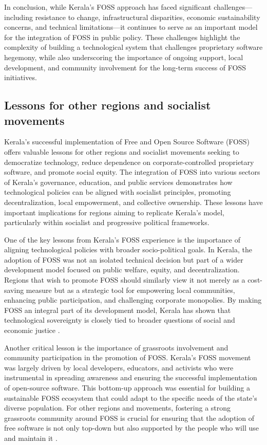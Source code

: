 \begin{refsection}
In conclusion, while Kerala’s FOSS approach has faced significant challenges—including resistance to change, infrastructural disparities, economic sustainability concerns, and technical limitations—it continues to serve as an important model for the integration of FOSS in public policy. These challenges highlight the complexity of building a technological system that challenges proprietary software hegemony, while also underscoring the importance of ongoing support, local development, and community involvement for the long-term success of FOSS initiatives.

\subsection{Lessons for other regions and socialist movements}

Kerala’s successful implementation of Free and Open Source Software (FOSS) offers valuable lessons for other regions and socialist movements seeking to democratize technology, reduce dependence on corporate-controlled proprietary software, and promote social equity. The integration of FOSS into various sectors of Kerala's governance, education, and public services demonstrates how technological policies can be aligned with socialist principles, promoting decentralization, local empowerment, and collective ownership. These lessons have important implications for regions aiming to replicate Kerala’s model, particularly within socialist and progressive political frameworks.

One of the key lessons from Kerala’s FOSS experience is the importance of aligning technological policies with broader socio-political goals. In Kerala, the adoption of FOSS was not an isolated technical decision but part of a wider development model focused on public welfare, equity, and decentralization. Regions that wish to promote FOSS should similarly view it not merely as a cost-saving measure but as a strategic tool for empowering local communities, enhancing public participation, and challenging corporate monopolies. By making FOSS an integral part of its development model, Kerala has shown that technological sovereignty is closely tied to broader questions of social and economic justice \cite[pp.~45-47]{isaac2000local}.

Another critical lesson is the importance of grassroots involvement and community participation in the promotion of FOSS. Kerala’s FOSS movement was largely driven by local developers, educators, and activists who were instrumental in spreading awareness and ensuring the successful implementation of open-source software. This bottom-up approach was essential for building a sustainable FOSS ecosystem that could adapt to the specific needs of the state’s diverse population. For other regions and movements, fostering a strong grassroots community around FOSS is crucial for ensuring that the adoption of free software is not only top-down but also supported by the people who will use and maintain it \cite[pp.~11-13]{palackal2007information}.


\end{refsection}
